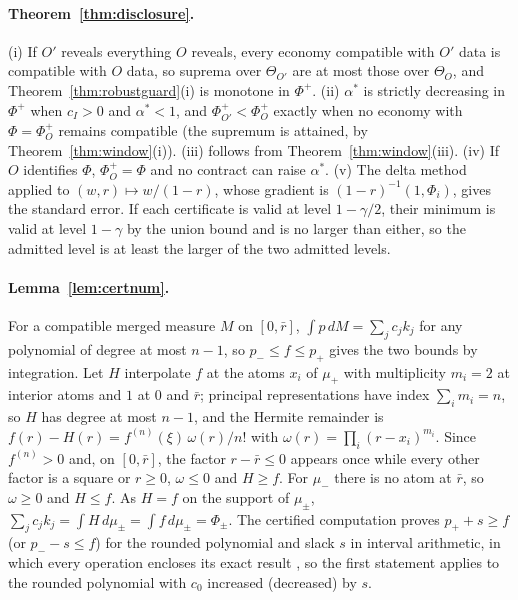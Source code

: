 \paragraph{Theorem~\ref{thm:disclosure}.} (i) If $O'$ reveals everything $O$ reveals, every economy compatible with $O'$ data is compatible with $O$ data, so suprema over $\Theta_{O'}$ are at most those over $\Theta_O$, and Theorem~\ref{thm:robustguard}(i) is monotone in $\Phi^+$. (ii) $\alpha^*$ is strictly decreasing in $\Phi^+$ when $c_I>0$ and $\alpha^*<1$, and $\Phi^+_{O'}<\Phi^+_O$ exactly when no economy with $\Phi=\Phi^+_O$ remains compatible (the supremum is attained, by Theorem~\ref{thm:window}(i)). (iii) follows from Theorem~\ref{thm:window}(iii). (iv) If $O$ identifies $\Phi$, $\Phi^+_O=\Phi$ and no contract can raise $\alpha^*$. (v) The delta method applied to $(w,r)\mapsto w/(1-r)$, whose gradient is $(1-r)^{-1}(1,\Phi_i)$, gives the standard error. If each certificate is valid at level $1-\gamma/2$, their minimum is valid at level $1-\gamma$ by the union bound and is no larger than either, so the admitted level is at least the larger of the two admitted levels.

\paragraph{Lemma~\ref{lem:certnum}.} For a compatible merged measure $M$ on $[0,\bar r]$, $\int p\,dM=\sum_jc_jk_j$ for any polynomial of degree at most $n-1$, so $p_-\le f\le p_+$ gives the two bounds by integration. Let $H$ interpolate $f$ at the atoms $x_i$ of $\mu_+$ with multiplicity $m_i=2$ at interior atoms and $1$ at $0$ and $\bar r$; principal representations have index $\sum_im_i=n$, so $H$ has degree at most $n-1$, and the Hermite remainder is $f(r)-H(r)=f^{(n)}(\xi)\,\omega(r)/n!$ with $\omega(r)=\prod_i(r-x_i)^{m_i}$. Since $f^{(n)}>0$ and, on $[0,\bar r]$, the factor $r-\bar r\le0$ appears once while every other factor is a square or $r\ge0$, $\omega\le0$ and $H\ge f$. For $\mu_-$ there is no atom at $\bar r$, so $\omega\ge0$ and $H\le f$. As $H=f$ on the support of $\mu_\pm$, $\sum_jc_jk_j=\int H\,d\mu_\pm=\int f\,d\mu_\pm=\Phi_\pm$. The certified computation proves $p_++s\ge f$ (or $p_--s\le f$) for the rounded polynomial and slack $s$ in interval arithmetic, in which every operation encloses its exact result \citep{rump2010}, so the first statement applies to the rounded polynomial with $c_0$ increased (decreased) by $s$.

